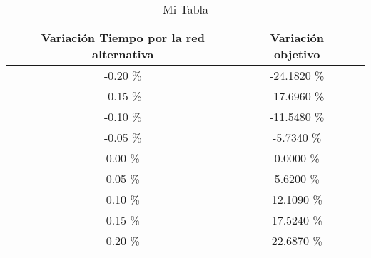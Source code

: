 \begin{table}
\centering
\begin{tabular}{|c|c|c|}
\hline
 Variación Tiempo por la red alternativa & Variación objetivo \\ \hline
-0.20 \% & -24.1820 \% \\ \hline
-0.15 \% & -17.6960 \% \\ \hline
-0.10 \% & -11.5480 \% \\ \hline
-0.05 \% & -5.7340 \% \\ \hline
0.00 \% & 0.0000 \% \\ \hline
0.05 \% & 5.6200 \% \\ \hline
0.10 \% & 12.1090 \% \\ \hline
0.15 \% & 17.5240 \% \\ \hline
0.20 \% & 22.6870 \% \\ \hline
\end{tabular}
\caption{Mi Tabla}
\end{table}
